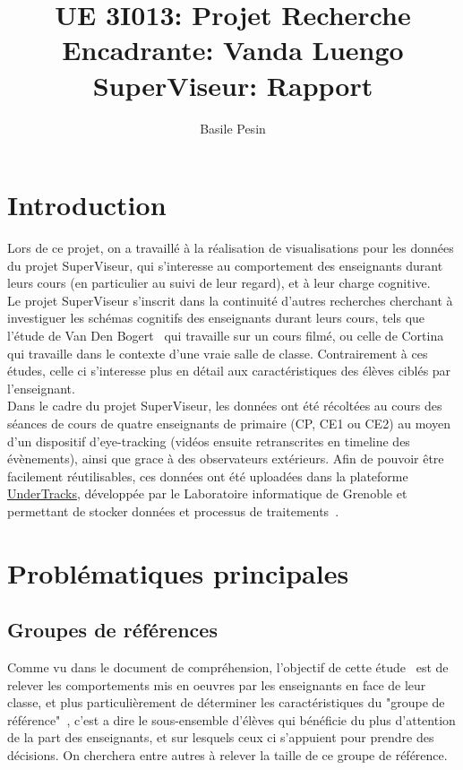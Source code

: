 \documentclass{article}
\title{UE 3I013: Projet Recherche\\
    Encadrante: Vanda Luengo\\
    SuperViseur: Rapport}
\author{Basile Pesin}
\begin{document}
\maketitle
\newpage

\tableofcontents
\newpage

\section{Introduction}
Lors de ce projet, on a travaillé à la réalisation de visualisations pour les données du projet SuperViseur, qui s'interesse au comportement des enseignants durant leurs cours (en particulier au suivi de leur regard), et à leur charge cognitive.\\
Le projet SuperViseur s'inscrit dans la continuité d'autres recherches cherchant à investiguer les schémas cognitifs des enseignants durant leurs cours, tels que l'étude de Van Den Bogert~\cite{VanDenBogert} qui travaille sur un cours filmé, ou celle de Cortina~\cite{Cortina} qui travaille dans le contexte d'une vraie salle de classe. Contrairement à ces études, celle ci s'interesse plus en détail aux caractéristiques des élèves ciblés par l'enseignant.\\
Dans le cadre du projet SuperViseur, les données ont été récoltées au cours des séances de cours de quatre enseignants de primaire (CP, CE1 ou CE2) au moyen d'un dispositif d'eye-tracking (vidéos ensuite retranscrites en timeline des évènements), ainsi que grace à des observateurs extérieurs. Afin de pouvoir être facilement réutilisables, ces données ont été uploadées dans la plateforme \href{https://undertracks.imag.fr/}{UnderTracks}, développée par le Laboratoire informatique de Grenoble et permettant de stocker données et processus de traitements~\cite{CPDEP}.

\section{Problématiques principales}

\subsection{Groupes de références}
Comme vu dans le document de compréhension, l'objectif de cette étude~\cite{SuperViseur} est de relever les comportements mis en oeuvres par les enseignants en face de leur classe, et plus particulièrement de déterminer les caractéristiques du "groupe de référence"~\cite{Cortina}, c'est a dire le sous-ensemble d'élèves qui bénéficie du plus d'attention de la part des enseignants, et sur lesquels ceux ci s'appuient pour prendre des décisions. On cherchera entre autres à relever la taille de ce groupe de référence.
\end{document}
